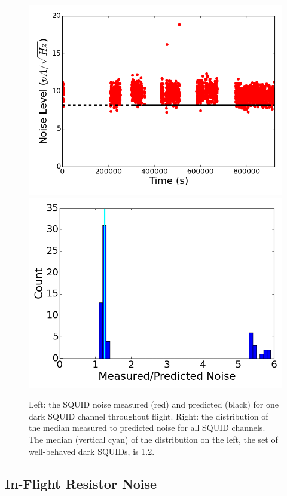 \begin{figure}[htp]
\begin{center}
\includegraphics[width=0.48\columnwidth]{figures/board66_wire4_ch09_noise_vs_time.png}
\includegraphics[width=0.48\columnwidth]{figures/squid_noise_histogram.png}
\caption[SQUID noise versus time and histogram of all dark squids' median noise]{Left: the \ac{SQUID} noise measured (red) and predicted (black) for one dark \ac{SQUID} channel throughout flight. Right: the distribution of the median measured to predicted noise for all \ac{SQUID} channels. The median (vertical cyan) of the distribution on the left, the set of well-behaved dark \ac{SQUID}s, is 1.2. 
\label{fig:squid_in_flight_noise} }
\end{center}
\end{figure}


\subsection{In-Flight Resistor Noise}
\label{sec:flight_resistor_noise}

